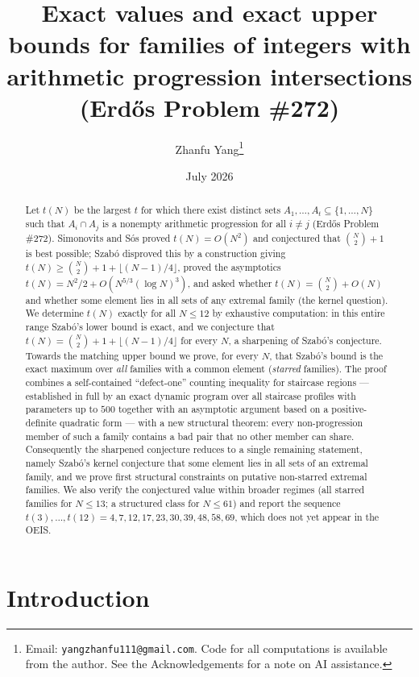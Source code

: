 \documentclass[11pt]{article}
\title{Exact values and exact upper bounds for families of integers with arithmetic progression intersections\\ \large (Erd\H{o}s Problem \#272)}
\author{Zhanfu Yang\thanks{Email: \texttt{yangzhanfu111@gmail.com}. Code for all computations is available from the author. See the Acknowledgements for a note on AI assistance.}}
\date{July 2026}
\theoremstyle{definition}
\begin{document}
\maketitle

\begin{abstract}
Let $t(N)$ be the largest $t$ for which there exist distinct sets $A_1,\dots,A_t\subseteq\{1,\dots,N\}$ such that $A_i\cap A_j$ is a nonempty arithmetic progression for all $i\neq j$ (Erd\H{o}s Problem \#272). Simonovits and S\'os proved $t(N)=O(N^2)$ and conjectured that $\binom N2+1$ is best possible; Szab\'o disproved this by a construction giving $t(N)\ge\binom N2+1+\lfloor(N-1)/4\rfloor$, proved the asymptotics $t(N)=N^2/2+O(N^{5/3}(\log N)^3)$, and asked whether $t(N)=\binom N2+O(N)$ and whether some element lies in all sets of any extremal family (the kernel question). We determine $t(N)$ exactly for all $N\le 12$ by exhaustive computation: in this entire range Szab\'o's lower bound is exact, and we conjecture that $t(N)=\binom N2+1+\lfloor(N-1)/4\rfloor$ for every $N$, a sharpening of Szab\'o's conjecture. Towards the matching upper bound we prove, for every $N$, that Szab\'o's bound is the exact maximum over \emph{all} families with a common element (\emph{starred} families). The proof combines a self-contained ``defect-one'' counting inequality for staircase regions --- established in full by an exact dynamic program over all staircase profiles with parameters up to $500$ together with an asymptotic argument based on a positive-definite quadratic form --- with a new structural theorem: every non-progression member of such a family contains a bad pair that no other member can share. Consequently the sharpened conjecture reduces to a single remaining statement, namely Szab\'o's kernel conjecture that some element lies in all sets of an extremal family, and we prove first structural constraints on putative non-starred extremal families. We also verify the conjectured value within broader regimes (all starred families for $N\le13$; a structured class for $N\le61$) and report the sequence $t(3),\dots,t(12)=4,7,12,17,23,30,39,48,58,69$, which does not yet appear in the OEIS.
\end{abstract}

\section{Introduction}
\end{document}
